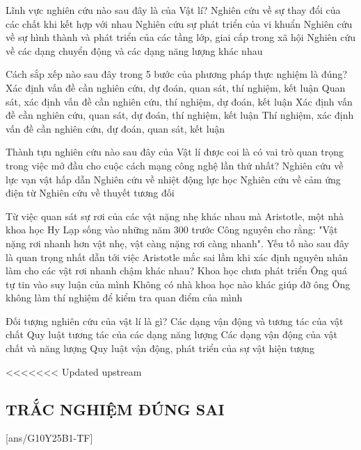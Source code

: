 \begin{ex}
	Lĩnh vực nghiên cứu nào sau đây là của Vật lí?
	\choice
	{Nghiên cứu về sự thay đổi của các chất khi kết hợp với nhau}
	{Nghiên cứu sự phát triển của vi khuẩn}
	{Nghiên cứu về sự hình thành và phát triển của các tầng lớp, giai cấp trong xã hội}
	{\True Nghiên cứu về các dạng chuyển động và các dạng năng lượng khác nhau}
	\loigiai{}
\end{ex}

\begin{ex}
	Cách sắp xếp nào sau đây trong 5 bước của phương pháp thực nghiệm là đúng?
	\choice
	{Xác định vấn đề cần nghiên cứu, dự đoán, quan sát, thí nghiệm, kết luận}
	{Quan sát, xác định vấn đề cần nghiên cứu, thí nghiệm, dự đoán, kết luận}
	{\True Xác định vấn đề cần nghiên cứu, quan sát, dự đoán, thí nghiệm, kết luận}
	{Thí nghiệm, xác định vấn đề cần nghiên cứu, dự đoán, quan sát, kết luận}
	\loigiai{}
\end{ex}

\begin{ex}
	Thành tựu nghiên cứu nào sau đây của Vật lí được coi là có vai trò quan trọng trong việc mở đầu cho cuộc cách mạng công nghệ lần thứ nhất?
	\choice
	{Nghiên cứu về lực vạn vật hấp dẫn}
	{\True Nghiên cứu về nhiệt động lực học}
	{Nghiên cứu về cảm ứng điện từ}
	{Nghiên cứu về thuyết tương đối}
	\loigiai{}
\end{ex}

\begin{ex}
	Từ việc quan sát sự rơi của các vật nặng nhẹ khác nhau mà Aristotle, một nhà khoa học Hy Lạp sống vào những năm 300 trước Công nguyên cho rằng: "Vật nặng rơi nhanh hơn vật nhẹ, vật càng nặng rơi càng nhanh". Yếu tố nào sau đây là quan trọng nhất dẫn tới việc Aristotle mắc sai lầm khi xác định nguyên nhân làm cho các vật rơi nhanh chậm khác nhau?
	\choice
	{Khoa học chưa phát triển}
	{Ông quá tự tin vào suy luận của mình}
	{Không có nhà khoa học nào khác giúp đỡ ông}
	{\True Ông không làm thí nghiệm để kiểm tra quan điểm của mình}
	\loigiai{}
\end{ex}

\begin{ex}
	Đối tượng nghiên cứu của vật lí là gì?
	\choice
	{Các dạng vận động và tương tác của vật chất}
	{Quy luật tương tác của các dạng năng lượng}
	{\True Các dạng vận động của vật chất và năng lượng}
	{Quy luật vận động, phát triển của sự vật hiện tượng}
	\loigiai{}
\end{ex}
<<<<<<< Updated upstream
\subsection{TRẮC NGHIỆM ĐÚNG SAI}
\setcounter{ex}{0}
[ans/G10Y25B1-TF]
\begin{ex}
	
	\choiceTF[t]
	{}
	{}
	{}
	{}
	\loigiai{}
\end{ex}
